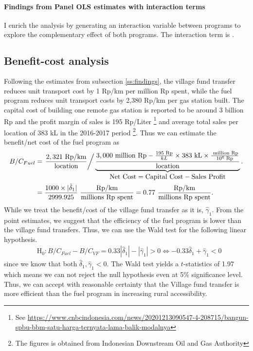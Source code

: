 \documentclass[letterpaper,12pt,leqno]{article}
\newcommand{\Hy}{\text{H}}
\begin{document}
\paragraph{Findings from Panel OLS estimates with interaction terms}
        I enrich the analysis by generating an interaction variable between programs to explore the complementary effect of both programs. The interaction term is .

\subsection{Benefit-cost analysis}
Following the estimates from subsection \ref{ss:findings}, the village fund transfer reduces unit transport cost by 1 Rp/km per million Rp spent, while the fuel program reduces unit transport costs by 2,380 Rp/km per gas station built. The capital cost of building one remote gas station is reported to be around 3 billion Rp and the profit margin of sales is 195 Rp/Liter \footnote{See \href{https://www.cnbcindonesia.com/news/20201213090547-4-208715/bangun-spbu-bbm-satu-harga-ternyata-lama-balik-modalnya}{https://www.cnbcindonesia.com/news/20201213090547-4-208715/bangun-spbu-bbm-satu-harga-ternyata-lama-balik-modalnya}} and average total sales per location of 383 kL in the 2016-2017 period \footnote{The figures is obtained from Indonesian Downstream Oil and Gas Authority}.
Thus we can estimate the benefit/net cost of the fuel program as
\begin{align*}
   B/C_{Fuel}&=\left.\frac{2,321 \text{ Rp/km}}{\text{location}}\right/ \underbrace{\frac{3,000 \text{ million Rp}-\frac{195\text{ Rp}}{kL}\times 383\text{ kL}\times\frac{\text{ million Rp}}{10^6\text{ Rp}}}{\text{location}}}_{\displaystyle \text{Net Cost} = \text{Capital Cost} - \text{Sales Profit}}.\\
   &= \frac{1000 \times |\hat{\delta}_1|}{2999.925} \ \frac{\text{Rp/km}}{\text{millions Rp spent}}=0.77\ \frac{\text{Rp/km}}{\text{millions Rp spent}}.
\end{align*}
While we treat the benefit/cost of the village fund transfer as it is, $\hat{\gamma}_1$. From the point estimates, we suggest that the efficiency of the fuel program is lower than the village fund transfers. Thus, we can use the Wald test for the following linear hypothesis.
\begin{align*}
    &\Hy_0: B/C_{Fuel}-B/C_{VF}=0.33|\hat{\delta}_1|-|\hat{\gamma}_1|>0 \Leftrightarrow -0.33\hat{\delta}_1+\hat{\gamma}_1<0
\end{align*}
since we know that both $\hat{\delta}_1,\hat{\gamma}_1<0$. The Wald test yields a $t$-statistics of 1.97 which means we can not reject the null hypothesis even at 5\% significance level. Thus, we can accept with reasonable certainty that the Village fund transfer is more efficient than the fuel program in increasing rural accessibility.
\end{document}
